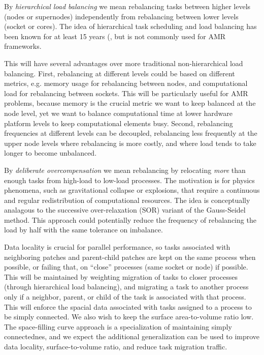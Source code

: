 \documentclass[14pt,letter]{article}
\begin{document}
%
By \textit{hierarchical load balancing} we mean rebalancing tasks
between higher levels (nodes or supernodes) independently from
rebalancing between lower levels (socket or cores).  The idea of
hierarchical task scheduling and load balancing has been known for at
least 15 years (\cite{AhGh94}, but is not commonly used for AMR
frameworks.

This will have several advantages over more traditional
non-hierarchical load balancing.  First, rebalancing at different
levels could be based on different metrics, e.g. memory usage for
rebalancing between nodes, and computational load for rebalancing
between sockets.  This will be particularly useful for AMR problems,
because memory is the crucial metric we want to keep balanced at the
node level, yet we want to balance computational time at lower
hardware platform levels to keep computational elements busy.  Second,
rebalancing frequencies at different levels can be decoupled,
rebalancing less frequently at the upper node levels where rebalancing
is more costly, and where load tends to take longer to become
unbalanced.

%
By \textit{deliberate overcompensation} we mean rebalancing by
relocating \textit{more} than enough tasks from high-load to low-load
processes.  The motivation is for physics phenomena, such as
gravitational collapse or explosions, that require a continuous and
regular redistribution of computational resources.  The idea is
conceptually analagous to the successive over-relaxation (SOR) variant
of the Gauss-Seidel method.  This approach could potentially reduce
the frequency of rebalancing the load by half with the same tolerance
on imbalance.

%
Data locality is crucial for parallel performance, so tasks associated
with neighboring patches and parent-child patches are kept on the same
process when possible, or failing that, on ``close'' processes (same
socket or node) if possible.  This will be maintained by weighting
migration of tasks to closer processes (through hierarchical load
balancing), and migrating a task to another process only if a
neighbor, parent, or child of the task is associated with that
process.  This will enforce the spacial data associated with tasks
assigned to a process to be simply connected.  We also wish to keep
the surface area-to-volume ratio low.  The space-filling curve
approach is a specialization of maintaining simply connectednes, and
we expect the additional generalization can be used to improve data
locality, surface-to-volume ratio, and reduce task migration traffic.
\end{document}
